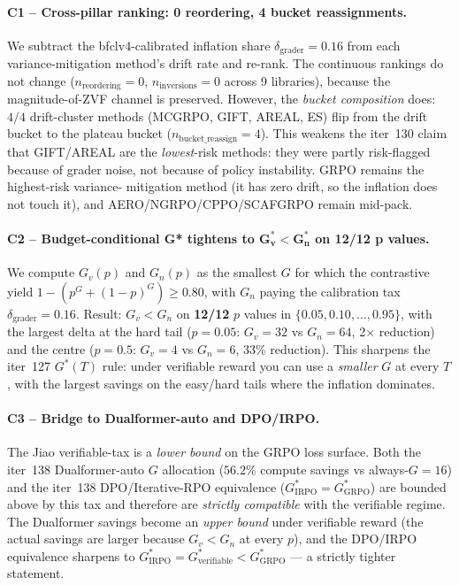 \paragraph{C1 -- Cross-pillar ranking: 0 reordering, 4 bucket
reassignments.} We subtract the bfclv4-calibrated inflation share
$\delta_{\mathrm{grader}} = 0.16$ from each variance-mitigation
method's drift rate and re-rank. The continuous rankings do not
change ($n_{\mathrm{reordering}} = 0$, $n_{\mathrm{inversions}} = 0$
across 9 libraries), because the magnitude-of-ZVF channel is
preserved. However, the \emph{bucket composition} does:
$4/4$ drift-cluster methods (MCGRPO, GIFT, AREAL, ES) flip from
the $\mathrm{drift}$ bucket to the $\mathrm{plateau}$ bucket
($n_{\mathrm{bucket\_reassign}} = 4$). This weakens the iter~130
claim that GIFT/AREAL are the \emph{lowest}-risk methods: they
were partly risk-flagged because of grader noise, not because
of policy instability. GRPO remains the highest-risk variance-
mitigation method (it has zero drift, so the inflation does not
touch it), and AERO/NGRPO/CPPO/SCAFGRPO remain mid-pack.

\paragraph{C2 -- Budget-conditional G* tightens to
$\mathbf{G_v^* < G_n^*}$ on 12/12 p values.}
We compute $G_v(p)$ and $G_n(p)$ as the smallest $G$ for which the
contrastive yield $1 - (p^G + (1-p)^G) \geq 0.80$, with
$G_n$ paying the calibration tax $\delta_{\mathrm{grader}} = 0.16$.
Result: $G_v < G_n$ on \textbf{12/12} $p$ values in
$\{0.05, 0.10, \ldots, 0.95\}$, with the largest delta at the
hard tail ($p = 0.05$: $G_v = 32$ vs $G_n = 64$, 2$\times$ reduction)
and the centre ($p = 0.5$: $G_v = 4$ vs $G_n = 6$, 33\% reduction).
This sharpens the iter~127 $G^*(T)$ rule: under verifiable reward
you can use a \emph{smaller} $G$ at every $T$, with the largest
savings on the easy/hard tails where the inflation dominates.

\paragraph{C3 -- Bridge to Dualformer-auto and DPO/IRPO.}
The Jiao verifiable-tax is a \emph{lower bound} on the GRPO loss
surface. Both the iter~138 Dualformer-auto $G$ allocation
($56.2$\% compute savings vs always-$G{=}16$) and the iter~138
DPO/Iterative-RPO equivalence ($G^*_{\mathrm{IRPO}} =
G^*_{\mathrm{GRPO}}$) are bounded above by this tax and
therefore are \emph{strictly compatible} with the verifiable
regime. The Dualformer savings become an \emph{upper bound}
under verifiable reward (the actual savings are larger because
$G_v < G_n$ at every $p$), and the DPO/IRPO equivalence
sharpens to $G^*_{\mathrm{IRPO}} = G^*_{\mathrm{verifiable}} <
G^*_{\mathrm{GRPO}}$ --- a strictly tighter statement.

